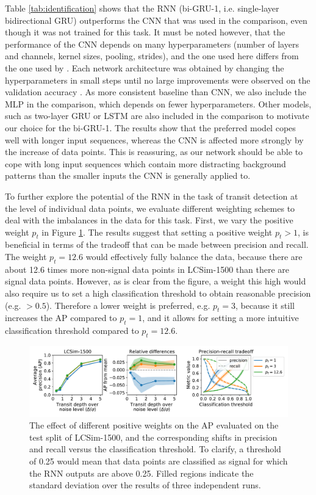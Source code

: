 Table \ref{tab:identification} shows that the RNN (bi-GRU-1, i.e. single-layer bidirectional GRU) outperforms the CNN that was used in the comparison, even though it was not trained for this task. It must be noted however, that the performance of the CNN depends on many hyperparameters (number of layers and channels, kernel sizes, pooling, strides), and the one used here differs from the one used by \cite{pearson2018searching}. Each network architecture was obtained by changing the hyperparameters in small steps until no large improvements were observed on the validation accuracy . As more consistent baseline than CNN, we also include the MLP in the comparison, which depends on fewer hyperparameters. Other models, such as two-layer GRU or LSTM are also included in the comparison to motivate our choice for the bi-GRU-1. The results show that the preferred model copes well with longer input sequences, whereas the CNN is affected more strongly by the increase of data points. This is reassuring, as our network should be able to cope with long input sequences which contain more distracting background patterns than the smaller inputs the CNN is generally applied to.

To further explore the potential of the RNN in the task of transit detection at the level of individual data points, we evaluate different weighting schemes to deal with the imbalances in the data for this task. First, we vary the positive weight $p_t$ in Figure \ref{fig:lcsim_weight_p}. The results suggest that setting a positive weight $p_t > 1$, is beneficial in terms of the tradeoff that can be made between precision and recall. The weight $p_t=12.6$ would effectively fully balance the data, because there are about 12.6 times more non-signal data points in LCSim-1500 than there are signal data points. However, as is clear from the figure, a weight this high would also require us to set a high classification threshold to obtain reasonable precision (e.g. $> 0.5$). Therefore a lower weight is preferred, e.g. $p_t = 3$, because it still increases the AP compared to $p_t = 1$, and it allows for setting a more intuitive classification threshold compared to $p_t = 12.6$.


\begin{figure}
    \centering
    \includegraphics[width=0.9\linewidth]{Experiments/Figures/Models/lcsim1500_AP_weighting-p.pdf}
    \caption{The effect of different positive weights on the AP evaluated on the test split of LCSim-1500, and the corresponding shifts in precision and recall versus the classification threshold. To clarify, a threshold of 0.25 would mean that data points are classified as signal for which the RNN outputs are above 0.25. Filled regions indicate the standard deviation over the results of three independent runs.}
    \label{fig:lcsim_weight_p}
\end{figure}

